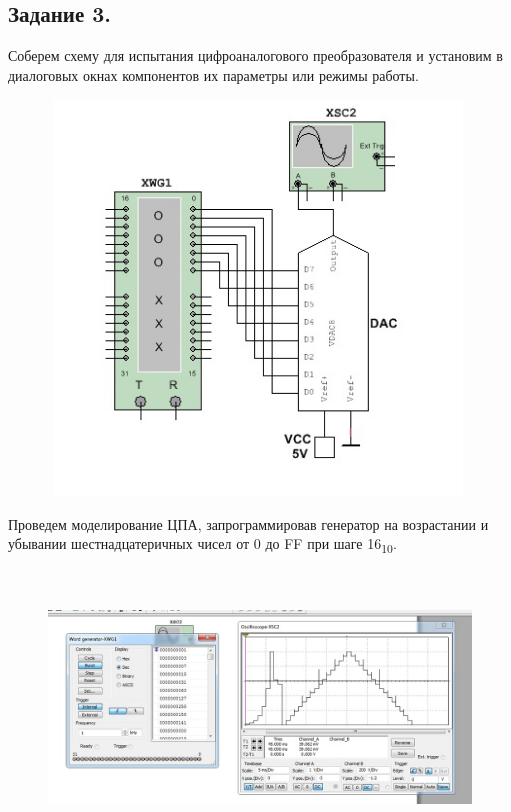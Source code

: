 \documentclass[spec, och, labwork]{shiza}
\begin{document}
\subsection*{Задание 3.}

Соберем схему для испытания цифроаналогового преобразователя и установим в
диалоговых окнах компонентов их параметры или режимы работы.

\begin{figure}[H]
    \centering
    \includegraphics[width=4.38333in,height=4.13333in]{image3.jpeg}\\
\end{figure}

Проведем моделирование ЦПА, запрограммировав генератор на возрастании и убывании
шестнадцатеричных чисел от 0 до FF при шаге 16\textsubscript{10}.

\begin{figure}[H]
    \centering
    \includegraphics[width=6.49167in,height=2.85in]{image4.jpeg}
\end{figure}
\end{document}
